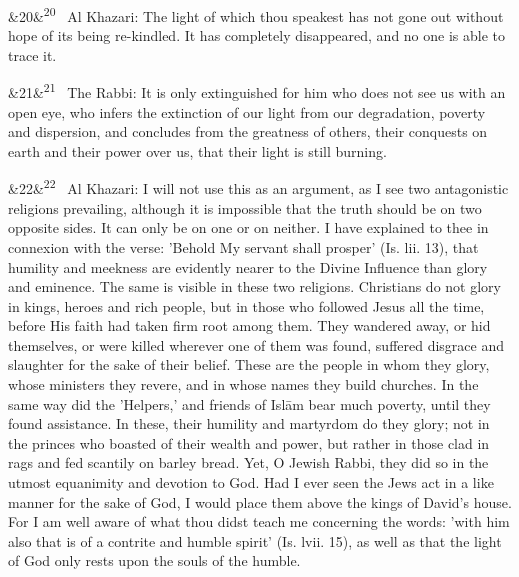 \documentclass[12pt]{article}
\newcommand{\para}[1][]{\par\noindent\ifx&#1&\else\textsuperscript{\footnotesize #1}~\fi}
\begin{document}
\para[20] Al Khazari: The light of which thou speakest has not gone out without hope of its being re-kindled. It has completely disappeared, and no one is able to trace it.

\para[21] The Rabbi: It is only extinguished for him who does not see us with an open eye, who infers the extinction of our light from our degradation, poverty and dispersion, and concludes from the greatness of others, their conquests on earth and their power over us, that their light is still burning.

\para[22] Al Khazari: I will not use this as an argument, as I see two antagonistic religions prevailing, although it is impossible that the truth should be on two opposite sides. It can only be on one or on neither. I have explained to thee in connexion with the verse: 'Behold My servant shall prosper' (Is. lii. 13), that humility and meekness are evidently nearer to the Divine Influence than glory and eminence. The same is visible in these two religions. Christians do not glory in kings, heroes and rich people, but in those who followed Jesus all the time, before His faith had taken firm root among them. They wandered away, or hid themselves, or were killed wherever one of them was found, suffered disgrace and slaughter for the sake of their belief. These are the people in whom they glory, whose ministers they revere, and in whose names they build churches. In the same way did the 'Helpers,' and friends of Islām bear much poverty, until they found assistance. In these, their humility and martyrdom do they glory; not in the princes who boasted of their wealth and power, but rather in those clad in rags and fed scantily on barley bread. Yet, O Jewish Rabbi, they did so in the utmost equanimity and devotion to God. Had I ever seen the Jews act in a like manner for the sake of God, I would place them above the kings of David's house. For I am well aware of what thou didst teach me concerning the words: 'with him also that is of a contrite and humble spirit' (Is. lvii. 15), as well as that the light of God only rests upon the souls of the humble.
\end{document}
